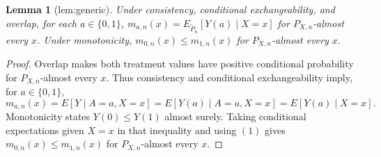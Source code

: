\documentclass{article}
\newtheorem{lemma}{Lemma}
\begin{document}
\begin{lemma}[lem:generic]\label{lem:generic}
Under consistency, conditional exchangeability, and overlap, for each \(a\in\{0,1\}\), \(m_{a,n}(x)=E_{\widetilde P_n}[Y(a)\mid X=x]\) for \(P_{X,n}\)-almost every \(x\). Under monotonicity, \(m_{0,n}(x)\le m_{1,n}(x)\) for \(P_{X,n}\)-almost every \(x\).
\end{lemma}
\begin{proof}
Overlap makes both treatment values have positive conditional probability for \(P_{X,n}\)-almost every \(x\). Thus consistency and conditional exchangeability imply, for \(a\in\{0,1\}\),
\[m_{a,n}(x)=E[Y\mid A=a,X=x]=E[Y(a)\mid A=a,X=x]=E[Y(a)\mid X=x].\tag{1}\]
Monotonicity states \(Y(0)\le Y(1)\) almost surely. Taking conditional expectations given \(X=x\) in that inequality and using \((1)\) gives \(m_{0,n}(x)\le m_{1,n}(x)\) for \(P_{X,n}\)-almost every \(x\).
\end{proof}
\end{document}
